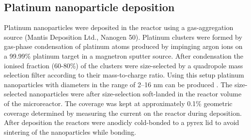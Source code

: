 \documentclass[8.5pt,twoside,twocolumn]{article}
\begin{document}
\subsection{Platinum nanoparticle deposition}
Platinum nanoparticles were deposited in the reactor using a gas-aggregation source (Mantis Deposition Ltd., Nanogen 50). Platinum clusters were formed by gas-phase condensation of platinum atoms produced by impinging argon ions on a 99.99\% platinum target in a magnetron sputter source. After condensation the ionised fraction (60-80\%) of the clusters were size-selected by a quadropole mass selection filter according to their mass-to-charge ratio. Using this setup platinum nanoparticles with diameters in the range of 2–16 nm can be produced \cite{Nielsen2010,Nielsen2009}. The size-selected nanoparticles were after size-selection soft-landed in the reactor volume of the microreactor. The coverage was kept at approximately 0.1\% geometric coverage determined by measuring the current on the reactor during deposition. After deposition the reactors were anodicly cold-bonded \cite{Vesborg2010} to a pyrex lid to avoid sintering of the nanoparticles while bonding.

\end{document}
